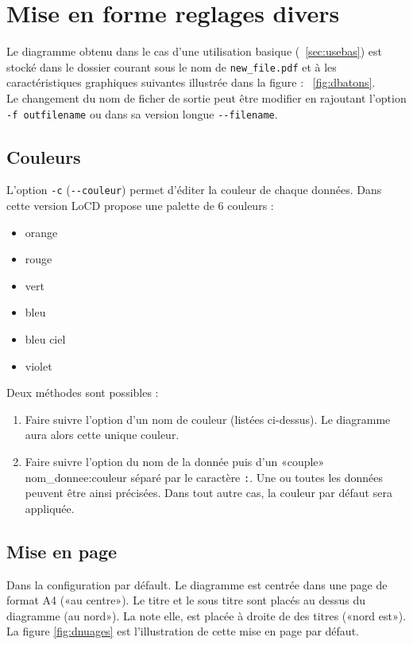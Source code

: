 \section{Mise en forme reglages divers}
Le diagramme obtenu dans le cas d'une utilisation basique (~\ref{sec:usebas}) est stocké dans le dossier courant sous le nom de \verb+new_file.pdf+ et à les caractéristiques graphiques suivantes illustrée dans la figure :  ~\ref{fig:dbatons}.\\ Le changement du nom de ficher de sortie peut être modifier en rajoutant l'option \verb+-f outfilename+ ou dans sa version longue \verb+--filename+. 
\subsection{Couleurs}
\label{subsec:couleurs}
L'option \verb+-c+ (\verb+--couleur+) permet d'éditer la couleur de chaque données. Dans cette version LoCD propose une palette de 6 couleurs :
\begin{itemize}
\item
orange
\item
rouge
\item
vert
\item
bleu
\item
bleu ciel
\item
violet
\end{itemize}
Deux méthodes sont possibles :
\begin{enumerate}
\item
Faire suivre l'option d'un nom de couleur (listées ci-dessus). Le diagramme aura alors cette unique couleur.
\item
Faire suivre l'option du nom de la donnée puis d'un «couple» nom\_donnee:couleur séparé par le caractère \verb+:+. Une ou toutes les données peuvent être ainsi précisées. Dans tout autre cas, la couleur par défaut sera appliquée.
\end{enumerate}   
\subsection{Mise en page}
\label{subsec:misepage}
Dans la configuration par défault. Le diagramme est centrée dans une page de format A4 («au centre»). Le titre et le sous titre sont placés au dessus du diagramme (au nord»). La note elle, est placée à droite de des titres («nord est»). La figure \ref{fig:dnuages} est l'illustration de cette mise en page par défaut.
 
